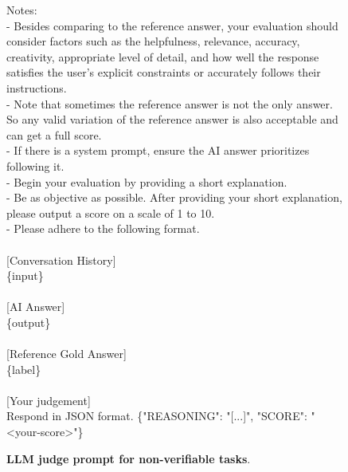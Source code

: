 \documentclass[table]{ai2style/ai2}
\begin{document}
{{\begin{figure}[h]
\begin{prompt}{}
Notes:\\
- Besides comparing to the reference answer, your evaluation should consider factors such as the helpfulness, relevance, accuracy, creativity, appropriate level of detail, and how well the response satisfies the user's explicit constraints or accurately follows their instructions.\\
- Note that sometimes the reference answer is not the only answer. So any valid variation of the reference answer is also acceptable and can get a full score. \\
- If there is a system prompt, ensure the AI answer prioritizes following it. \\
- Begin your evaluation by providing a short explanation. \\
- Be as objective as possible. After providing your short explanation, please output a score on a scale of 1 to 10. \\
- Please adhere to the following format. \\ \\

[Conversation History]\\
\{input\} \\ \\

[AI Answer]\\
\{output\}\\ \\

[Reference Gold Answer]\\
\{label\}\\ \\

[Your judgement]\\
Respond in JSON format. \{"REASONING": "[...]", "SCORE": "<your-score>"\}
\end{prompt}
\vspace{-1em}
\caption{\textbf{LLM judge prompt for non-verifiable tasks}.}
\label{llm-judge-prompt}
\end{figure}

}}
\end{document}
